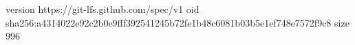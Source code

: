 version https://git-lfs.github.com/spec/v1
oid sha256:a4314022e92c2b0e9fff392541245b72fe1b48c6081b03b5e1ef748e7572f9c8
size 996
